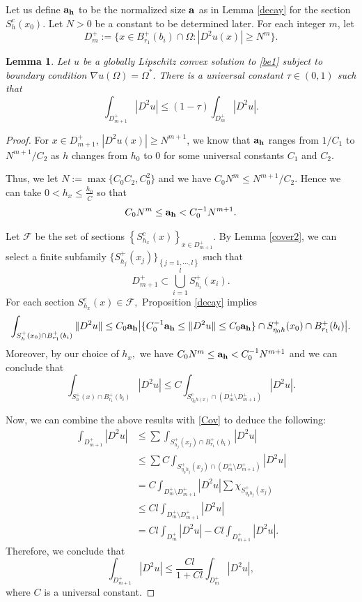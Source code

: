 \documentclass[11pt]{amsart}
\theoremstyle{plain}
\newtheorem{lemma}{Lemma}[section]
\newcommand{\0}{\textbf{0}}
\numberwithin{equation}{section}
\numberwithin{equation}{section}
\numberwithin{figure}{section}
\begin{document}
Let us define ${\bf a_h}$ to be the normalized size ${\bf a}$ as in Lemma \ref{decay} for the section $S^c_h(x_0).$ Let $N>0$ be a constant to be determined later. For each integer $m$, let $$D^+_m:=\{x\in B^{+}_{r_1}(b_i)\cap \Omega: |D^2u(x)|\ge N^m\}.$$ 

\begin{lemma}\label{LevelSetDecay}
	Let $u$ be a globally Lipschitz convex solution to \eqref{be1} subject to boundary condition $\nabla u(\Omega) =\Omega^*.$ There is a universal constant $\tau\in(0,1)$ such that    $$\int_{D^+_{m+1}}|D^2u|\le (1-\tau)\int_{D^+_m}|D^2u|.$$
\end{lemma} 

\begin{proof}
	
	For $x\in D^+_{m+1}$, $|D^2u(x)|\ge N^{m+1}$, we know that ${\bf a_h}$ ranges from $1/C_1$ to $N^{m+1}/C_2$ as $h$ changes from $h_0$ to $0$ for some universal constants $C_1$ and $C_2.$
	
	Thus, we let $N :=\max\{C_0C_2,C_0^2\}$ and we have $C_0 N^{m}\le N^{m+1}/C_2$. Hence we can take $0<h_x\leq \frac{h_0}{\bar{C}}$ so that $$C_0N^m\le {\bf a_h}< C_0^{-1}N^{m+1}.$$ 
	
	Let $\mathcal{F}$ be the set of sections $\left\{S^c_{h_x}(x)\right\}_{x\in D^+_{m+1}}.$ By Lemma \ref{cover2}, we can select a finite subfamily $\{S^+_{h_j}(x_j)\}_{ \left\{j=1,\cdots,l\right\}}$ such that
	\begin{equation}\label{Cov}
		D^+_{m+1}\subset \bigcup^{l}_{i=1} S^+_{h_i}(x_i).
	\end{equation}
	For each section $S^c_{h_x}(x)\in \mathcal{F},$
	Proposition \ref{decay} implies $$\int_{S^+_h(x_0) \cap  B^{+}_{r_1}(b_i)}\|D^2u\| \leq C_0 {\bf a_h} \big|\{ C_0^{-1}{\bf a_h}\leq \|D^2u\| \leq C_0 {\bf a_h}\} \cap S^+_{ \eta_0 h}(x_0) \cap  B^{+}_{r_1}(b_i) \big|.$$ Moreover, by our choice of $h_x,$  we have $C_0N^m\le {\bf a_h}< C_0^{-1}N^{m+1}$ and we can conclude that
	\begin{equation*}
		\int_{S^+_h(x)\cap B^{+}_{r_1}(b_i)}|D^2u|\le C\int_{S^c_{\eta_0h(x)}\cap (D^+_m\setminus D^+_{m+1})}|D^2u|.
	\end{equation*} 
	
	Now, we can combine the above results with \eqref{Cov} to deduce the following:
	\begin{align*}
		\int_{D^+_{m+1}}|D^2u|&\le\sum\int_{S^+_{h_j}(x_j)\cap B^{+}_{r_1}(b_i)}|D^2u|\\&\le \sum C\int_{S^+_{\eta_0h_j}(x_j)\cap (D^+_m\setminus D^+_{m+1})}|D^2u|\\&=C\int_{D^+_m\setminus D^+_{m+1}}|D^2u|\sum\chi_{S^+_{\eta_0h_j}(x_j)}\\&\le C l\int_{D^+_m\setminus D^+_{m+1}}|D^2u|\\&=C l\int_{D^+_m}|D^2u|-C l\int_{D^+_{m+1}}|D^2u|.
	\end{align*}
	Therefore, we conclude that
	$$\int_{D^+_{m+1}}|D^2u|\le \frac{C l}{1+C l}\int_{D^+_{m}}|D^2u|,$$ where $C$ is a universal constant. 
	
	
\end{proof} 
\end{document}
